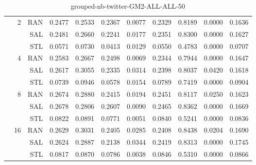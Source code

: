 \begin{center}
\begin{table}[htbp]
\begin{center}
\begin{tabular}{ | r | r | r | r | r | r | r | r | r | r | r |}
 & \multirow{3}{*}{2} & RAN & 0.2477 & 0.2533 & 0.2367 & 0.0077 & 0.2329 & 0.8189 & 0.0000 & 0.1636\\ \cline{3-11}
 &   & SAL & 0.2481 & 0.2660 & 0.2241 & 0.0177 & 0.2351 & 0.8300 & 0.0000 & 0.1627\\ \cline{3-11}
 &   & STL & 0.0571 & 0.0730 & 0.0413 & 0.0129 & 0.0550 & 0.4783 & 0.0000 & 0.0707\\ \cline{2-11}
 & \multirow{3}{*}{4} & RAN & 0.2583 & 0.2667 & 0.2498 & 0.0069 & 0.2344 & 0.7944 & 0.0000 & 0.1647\\ \cline{3-11}
 &   & SAL & 0.2617 & 0.3055 & 0.2335 & 0.0314 & 0.2398 & 0.8037 & 0.0420 & 0.1618\\ \cline{3-11}
 &   & STL & 0.0739 & 0.0946 & 0.0578 & 0.0154 & 0.0789 & 0.7419 & 0.0000 & 0.0904\\ \cline{2-11}
 & \multirow{3}{*}{8} & RAN & 0.2674 & 0.2880 & 0.2415 & 0.0194 & 0.2451 & 0.8117 & 0.0250 & 0.1623\\ \cline{3-11}
 &   & SAL & 0.2678 & 0.2806 & 0.2607 & 0.0090 & 0.2465 & 0.8362 & 0.0000 & 0.1669\\ \cline{3-11}
 &   & STL & 0.0822 & 0.0891 & 0.0771 & 0.0051 & 0.0840 & 0.5241 & 0.0000 & 0.0836\\ \cline{2-11}
 & \multirow{3}{*}{16} & RAN & 0.2629 & 0.3031 & 0.2405 & 0.0285 & 0.2408 & 0.8438 & 0.0204 & 0.1690\\ \cline{3-11}
 &   & SAL & 0.2624 & 0.2887 & 0.2138 & 0.0344 & 0.2419 & 0.8313 & 0.0000 & 0.1745\\ \cline{3-11}
 &   & STL & 0.0817 & 0.0870 & 0.0786 & 0.0038 & 0.0846 & 0.5310 & 0.0000 & 0.0866\\ \cline{2-11}
\hline
\end{tabular}
\caption{grouped-nb-twitter-GM2-ALL-ALL-50}
\end{center}
 \end{table}
\end{center}

